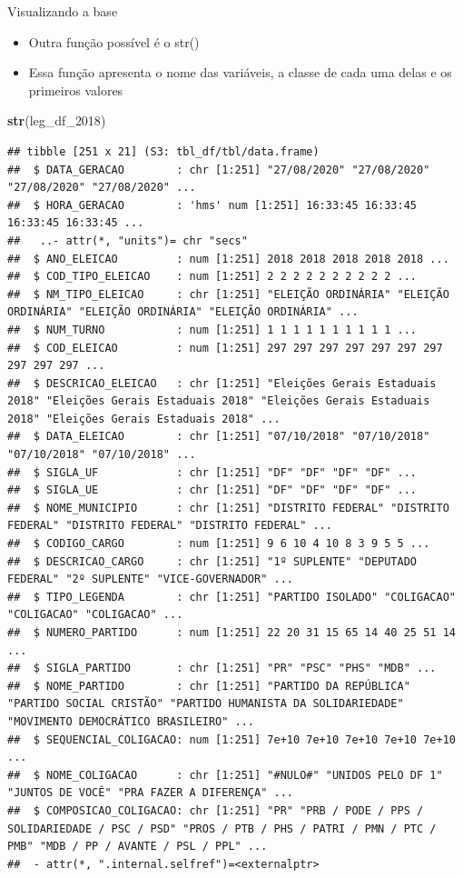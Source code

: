 \documentclass[
  10pt,
  ignorenonframetext,
]{beamer}
\newenvironment{Shaded}{\begin{snugshade}}{\end{snugshade}}
\newcommand{\DecValTok}[1]{\textcolor[rgb]{0.00,0.00,0.81}{#1}}
\newcommand{\KeywordTok}[1]{\textcolor[rgb]{0.13,0.29,0.53}{\textbf{#1}}}
\newcommand{\NormalTok}[1]{#1}
\providecommand{\tightlist}{%
  \setlength{\itemsep}{0pt}\setlength{\parskip}{0pt}}
\begin{document}
\begin{frame}[fragile]{Visualizando a base}
\protect\hypertarget{visualizando-a-base-4}{}
\begin{itemize}
\tightlist
\item
  Outra função possível é o str()
\item
  Essa função apresenta o nome das variáveis, a classe de cada uma delas
  e os primeiros valores
\end{itemize}

\begin{Shaded}
\begin{Highlighting}[]
\KeywordTok{str}\NormalTok{(leg\_df\_}\DecValTok{2018}\NormalTok{)}
\end{Highlighting}
\end{Shaded}

\begin{verbatim}
## tibble [251 x 21] (S3: tbl_df/tbl/data.frame)
##  $ DATA_GERACAO        : chr [1:251] "27/08/2020" "27/08/2020" "27/08/2020" "27/08/2020" ...
##  $ HORA_GERACAO        : 'hms' num [1:251] 16:33:45 16:33:45 16:33:45 16:33:45 ...
##   ..- attr(*, "units")= chr "secs"
##  $ ANO_ELEICAO         : num [1:251] 2018 2018 2018 2018 2018 ...
##  $ COD_TIPO_ELEICAO    : num [1:251] 2 2 2 2 2 2 2 2 2 2 ...
##  $ NM_TIPO_ELEICAO     : chr [1:251] "ELEIÇÃO ORDINÁRIA" "ELEIÇÃO ORDINÁRIA" "ELEIÇÃO ORDINÁRIA" "ELEIÇÃO ORDINÁRIA" ...
##  $ NUM_TURNO           : num [1:251] 1 1 1 1 1 1 1 1 1 1 ...
##  $ COD_ELEICAO         : num [1:251] 297 297 297 297 297 297 297 297 297 297 ...
##  $ DESCRICAO_ELEICAO   : chr [1:251] "Eleições Gerais Estaduais 2018" "Eleições Gerais Estaduais 2018" "Eleições Gerais Estaduais 2018" "Eleições Gerais Estaduais 2018" ...
##  $ DATA_ELEICAO        : chr [1:251] "07/10/2018" "07/10/2018" "07/10/2018" "07/10/2018" ...
##  $ SIGLA_UF            : chr [1:251] "DF" "DF" "DF" "DF" ...
##  $ SIGLA_UE            : chr [1:251] "DF" "DF" "DF" "DF" ...
##  $ NOME_MUNICIPIO      : chr [1:251] "DISTRITO FEDERAL" "DISTRITO FEDERAL" "DISTRITO FEDERAL" "DISTRITO FEDERAL" ...
##  $ CODIGO_CARGO        : num [1:251] 9 6 10 4 10 8 3 9 5 5 ...
##  $ DESCRICAO_CARGO     : chr [1:251] "1º SUPLENTE" "DEPUTADO FEDERAL" "2º SUPLENTE" "VICE-GOVERNADOR" ...
##  $ TIPO_LEGENDA        : chr [1:251] "PARTIDO ISOLADO" "COLIGACAO" "COLIGACAO" "COLIGACAO" ...
##  $ NUMERO_PARTIDO      : num [1:251] 22 20 31 15 65 14 40 25 51 14 ...
##  $ SIGLA_PARTIDO       : chr [1:251] "PR" "PSC" "PHS" "MDB" ...
##  $ NOME_PARTIDO        : chr [1:251] "PARTIDO DA REPÚBLICA" "PARTIDO SOCIAL CRISTÃO" "PARTIDO HUMANISTA DA SOLIDARIEDADE" "MOVIMENTO DEMOCRÁTICO BRASILEIRO" ...
##  $ SEQUENCIAL_COLIGACAO: num [1:251] 7e+10 7e+10 7e+10 7e+10 7e+10 ...
##  $ NOME_COLIGACAO      : chr [1:251] "#NULO#" "UNIDOS PELO DF 1" "JUNTOS DE VOCÊ" "PRA FAZER A DIFERENÇA" ...
##  $ COMPOSICAO_COLIGACAO: chr [1:251] "PR" "PRB / PODE / PPS / SOLIDARIEDADE / PSC / PSD" "PROS / PTB / PHS / PATRI / PMN / PTC / PMB" "MDB / PP / AVANTE / PSL / PPL" ...
##  - attr(*, ".internal.selfref")=<externalptr>
\end{verbatim}
\end{frame}
\end{document}
